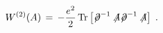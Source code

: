 \begin{equation}
 W^{(2)}(A) \,=\, - \frac{e^2}{2} \, {\rm Tr} \left[ {\not \! \partial}^{-1} \not\!\!A
 {\not \! \partial}^{-1} \not \!\!A \right] \;. 
\end{equation}

